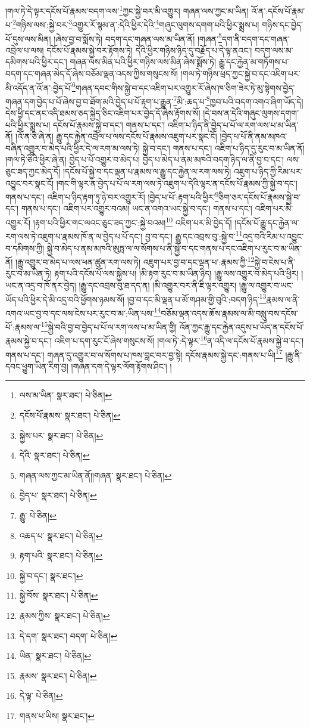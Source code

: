 །གལ་ཏེ་དེ་ལྟར་དངོས་པོ་རྣམས་བདག་ལས་\footnote{ལས་མ་ཡིན་  སྣར་ཐང་།  པེ་ཅིན། }ཀྱང་སྐྱེ་བར་མི་འགྱུར། གཞན་ལས་ཀྱང་མ་ཡིན། འོ་ན་:དངོས་པོ་རྣམ་པ་\footnote{དངོས་པོ་རྣམས་  སྣར་ཐང་།  པེ་ཅིན། }གཉིས་ལས་:སྐྱེ་བར་\footnote{སྐྱེས་པར་  སྣར་ཐང་།  པེ་ཅིན། }འགྱུར་རོ་སྙམ་ན་:དེའི་ཕྱིར་དེའི་\footnote{དེའི་  སྣར་ཐང་།  པེ་ཅིན། }གཞུང་ལུགས་དགག་པའི་ཕྱིར་སྨྲས་པ། གཉིས་དང་བྱེད་པོ་དུས་ལས་མིན། །ཞེས་བྱ་བ་སྨོས་ཏེ། བདག་དང་གཞན་ལས་མ་ཡིན་ནོ། །གཞན་\footnote{གཞན་ལས་ཀྱང་མ་ཡིན་ནོ།།གཞན་  སྣར་ཐང་།  པེ་ཅིན། }དག་ནི་བདག་དང་གཞན་འབྲེལ་པ་ལས། དངོས་པོ་རྣམས་སྐྱེ་བར་རྟོགས་ཏེ། དེའི་ཕྱིར་གཉིས་ཉིད་དུ་བརྗོད་པ་དེ་ལྟ་ནའང་། བདག་ལས་མ་དམིགས་པའི་ཕྱིར་དང་། གཞན་ལས་མིན་པའི་ཕྱིར་གཉིས་ལས་མིན་ཞེས་སྨོས་ཏེ། རྒྱུ་དང་རྐྱེན་མ་གཏོགས་པ་བདག་དང་གཞན་མེད་དོ་ཞེས་བཅོམ་ལྡན་འདས་ཀྱིས་གསུངས་སོ། །གལ་ཏེ་གཉིས་ཕྲད་ཀྱང་སྐྱེ་བ་དང་འཇིག་པར་མི་འདོད་ན་འོ་ན་:བྱེད་པོ་\footnote{བྱེད་པ་  སྣར་ཐང་།  པེ་ཅིན། }གཞན་དབང་གིས་སྐྱེ་བ་དང་འཇིག་པར་འགྱུར་རོ་ཞེས་ཁ་ཅིག་ཟེར་ཏེ་མུ་སྟེགས་བྱེད་གཞན་དག་བྱེད་པ་པོ་ཞེས་བྱ་བ་ཐོག་མའི་བྱེད་པ་པོ་རྟག་པ་རྒྱུན་\footnote{རྒྱུ་  པེ་ཅིན། }མི་:ཆད་པ་\footnote{འཆད་པ་  སྣར་ཐང་།  པེ་ཅིན། }ཁྱབ་པའི་བདག་འགའ་ཞིག་ཡོད་དེ། དེས་ཕྱི་དང་ནང་འདི་ཐམས་ཅད་སྐྱེད་ཅིང་འཇིག་པར་བྱེད་དོ་ཞེས་རྟོགས་སོ། །དེ་བས་ན་དེའི་གཞུང་ལུགས་དགག་པའི་ཕྱིར་སྨྲས་པ། དངོས་པོ་རྣམས་སྐྱེ་བ་དང་། གནས་པ་དང་། འཇིག་པ་ཉིད་ནི་བྱེད་པ་པོ་ལ་རག་ལས་པ་མ་ཡིན་ནོ། །འོ་ན་ཅི་ཞེ་ན། རྒྱུ་དང་རྐྱེན་འབྲེལ་པ་ལས་དངོས་པོ་རྣམས་འཇུག་པར་སྣང་ངོ། །བྱེད་པ་པོ་ནི་ནམ་མཁའ་བཞིན་འགྱུར་བ་མེད་པའི་ཕྱིར་དེ་ལ་རག་མ་ལས་ཏེ། སྐྱེ་བ་དང་། གནས་པ་དང་། འཇིག་པ་ཉིད་དུ་རུང་བ་མ་ཡིན་ནོ། །གལ་ཏེ་ཅིའི་ཕྱིར་ཞེ་ན། བྱེད་པ་པོ་འགྱུར་བ་མེད་པ། བྱེད་པ་མེད་པ་ནམ་མཁའི་བདག་ཉིད་ལ་ནི་བྱ་བ་དང་། ལས་ཅུང་ཟད་ཀྱང་མེད་དོ། །དངོས་པོ་སྐྱེ་བ་དང་ལྡན་པ་རྣམས་ལ་རྒྱུ་དང་རྐྱེན་ལ་རག་ལས་ཏེ། འཇུག་པ་ཉིད་ཀྱི་རིམ་པར་འབྱུང་བར་སྣང་ངོ། །གང་གི་ལྟར་ན་བྱེད་པ་པོ་ལ་རག་ལས་ཏེ་འཇུག་པ་དེའི་ལྟར་ན་དངོས་པོ་རྣམས་ཀྱི་སྐྱེ་བ་དང་། གནས་པ་དང་། འཇིག་པ་ཉིད་རྟག་ཏུ་ཉེ་བར་འགྱུར་རོ། །བྱེད་པ་པོ་:རྟག་པའི་ཕྱིར་\footnote{རྟག་པའི་  སྣར་ཐང་།  པེ་ཅིན། }ཅིག་ཅར་དངོས་པོ་རྣམས་སྐྱེ་བ་དང་། གནས་པ་དང་། འཇིག་པར་འགྱུར་བའམ། ཡང་ན་འགའ་ཡང་སྐྱེ་བ་དང་། གནས་པ་དང་། འཇིག་པར་མི་འགྱུར་རོ། །རྟག་པའི་ཕྱིར་གང་ལའང་ཅུང་ཟད་ཀྱང་:སྐྱེ་བའམ།\footnote{སྐྱེ་བ་དང་།  སྣར་ཐང་། } འཇིག་པར་མི་བྱེད་དོ། །དངོས་པོ་རྒྱུ་དང་རྐྱེན་ལ་རག་ལས་ཏེ་འཇུག་པ་རྣམས་ཁོ་ན་ལ་བྱེད་པ་པོ་དང་། བྱ་བ་དང་། རྒྱུ་དང་འབྲས་བུ་:སྐྱེ་བ་\footnote{སྐྱེ་བོས་  སྣར་ཐང་།  པེ་ཅིན། }འདྲ་བའི་རིམ་པ་འབྱུང་བ་དམིགས་ཀྱི། སྐྱེ་བ་མེད་པ་ནམ་མཁའི་ཨུཏྤ་ལ་ལ་སོགས་པ་ནི་སྐྱེ་བ་དང་གནས་པ་དང་འཇིག་པ་རུང་བ་མ་ཡིན་ནོ། །རྒྱུ་འགྱུར་བ་མེད་པ་ལས་ཕན་ཚུན་རག་ལས་ཏེ། འཇུག་པར་བྱ་བ་དང་ལྡན་པ་:རྣམས་ཀྱི་\footnote{རྣམས་ཀྱིས་  སྣར་ཐང་།  པེ་ཅིན། }སྐྱེ་བ་ངེས་པ་ནི་རུང་བ་མ་ཡིན་ཏེ། རྟག་པའི་དངོས་པོ་ལས་སྐྱེས་པ། །མི་རྟག་རུང་བ་མ་ཡིན་ཉིད། །རྒྱུ་ལས་འགྱུར་བ་མེད་པའི་ཕྱིར། །ཡང་ན་འདྲ་བ་ཁོ་ནར་བྱེད། །རྒྱུ་དང་འབྲས་བུ་ཐ་དད་ན། །མི་འགྱུར་བར་ནི་ཇི་ལྟར་འགྱུར། །རྒྱུ་ལ་འགྱུར་བ་ཡང་ཡོད་པའི་ཕྱིར་དེ་མི་འདྲ་བའི་ཕྱོགས་ཉམས་སོ། །བྱ་བ་དང་མི་ལྡན་པ་མོ་གཤམ་གྱི་བུའི་:བདག་ཉིད་\footnote{དེ་དག་  སྣར་ཐང་། བདག་  པེ་ཅིན། }རྣམས་ལ་ནི་འགའ་ཡང་བྱ་བ་དང་ལས་ངེས་པར་རུང་བ་མ་:ཡིན་པས་\footnote{ཡིན་  སྣར་ཐང་།  པེ་ཅིན། }བཅོམ་ལྡན་འདས་ཆོས་རྣམས་ལ་མི་བསླུ་བས་དངོས་པོ་:རྣམས་ལ་\footnote{རྣམས་  སྣར་ཐང་།  པེ་ཅིན། }སྐྱེ་བའི་བྱ་བ་བྱེད་པ་པོ་ལ་རག་ལས་པ་མ་ཡིན་གྱི། འོན་ཀྱང་རྒྱུ་དང་རྐྱེན་འདུས་པ་ཡོད་ན་དངོས་པོ་རྣམས་སྐྱེ་བ་དང་། འཇིག་པ་དག་རུང་ངོ་ཞེས་གསུངས་སོ། །གལ་ཏེ་:དེ་ལྟར་\footnote{དེ་ལྟ་  པེ་ཅིན། }ན་འདི་ལ་དངོས་པོ་རྣམས་སྐྱེ་བ་དང་། གནས་པ་དང་། གཞན་དུ་འགྱུར་བ་ལ་སོགས་པ་ཁས་བླང་བར་བྱ་སྟེ། དངོས་རྣམས་སྐྱེ་དང་:གནས་པ་ཡི།\footnote{གནས་པ་ཡིས།  སྣར་ཐང་། } །རྒྱུ་ནི་དབང་ཕྱུག་ཡིན་རིག་བྱ། །གཞན་དག་དེ་ལྟར་ལོག་རྟོགས་ཤིང་། །
